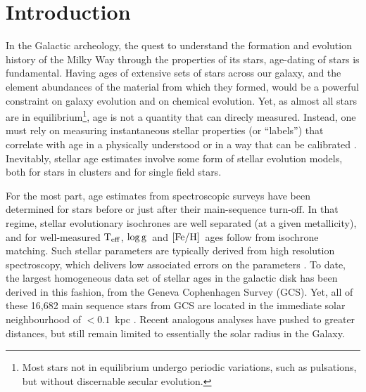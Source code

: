 \documentclass[12pt, preprint]{aastex}
\newcommand{\teff}{\mbox{$\rm T_{eff}$}}
\newcommand{\feh}{\mbox{$\rm [Fe/H]$}}
\newcommand{\logg}{\mbox{$\rm \log g$}}
\begin{document}

%
%

\section{Introduction}\label{sec:Intro}

In the Galactic archeology, the quest to understand the formation and evolution history of the Milky Way through the
properties of its stars, age-dating of stars is fundamental. Having ages of extensive sets of stars across our galaxy, and
the element abundances of the material from which they formed, would be a powerful constraint on galaxy evolution and on chemical evolution.
Yet, as almost all stars are in equilibrium\footnote{Most stars not in equilibrium undergo periodic variations, such as pulsations, but without discernable secular evolution.}, age is not a quantity that can direcly measured. Instead, one must rely on measuring instantaneous stellar properties (or ``labels'') that correlate with age in a physically understood or in a way that can be calibrated \citep[see][for an excellent review]{soderblom2010}.
Inevitably, stellar age estimates involve some form of stellar evolution models, both for stars in clusters and for single field stars. 

For the most part, age estimates from spectroscopic surveys have been determined for stars before or just after their main-sequence turn-off. 
In that regime, stellar evolutionary isochrones are well separated (at a given metallicity), and for well-measured \teff, \logg\ and \feh\ ages follow from isochrone matching. 
Such stellar parameters are typically derived from high resolution spectroscopy, which delivers low associated errors on the parameters \citep[e.g.][]{Bensby2013, Casagrande2011, haywood2013, B2014}.  To date, the largest homogeneous data set of stellar ages in the galactic disk has been derived in this fashion, from the Geneva Cophenhagen Survey (GCS). Yet, all of these 16,682 main sequence stars from GCS are located in the immediate solar neighbourhood of $<0.1$~kpc \citep{nordstrom2004short}.
Recent analogous analyses \citep[e.g.][]{haywood2013, B2014} have pushed to greater distances, but still remain limited to essentially the solar radius in the Galaxy.
\end{document}
